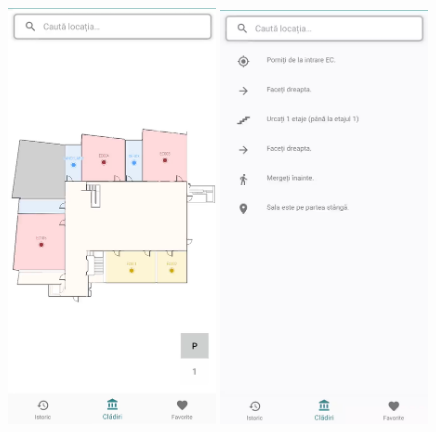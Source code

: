     \begin{figure}[!ht]
        \centering
        \begin{minipage}[b]{0.49\textwidth}
            \captionsetup{justification=centering}
             \includegraphics[width=0.49\textwidth]{figures/upb_apps/navigation/upb_campus_unpublished1.png}
             \includegraphics[width=0.49\textwidth]{figures/upb_apps/navigation/upb_campus_unpublished2.png}

\end{minipage}
\end{figure}
